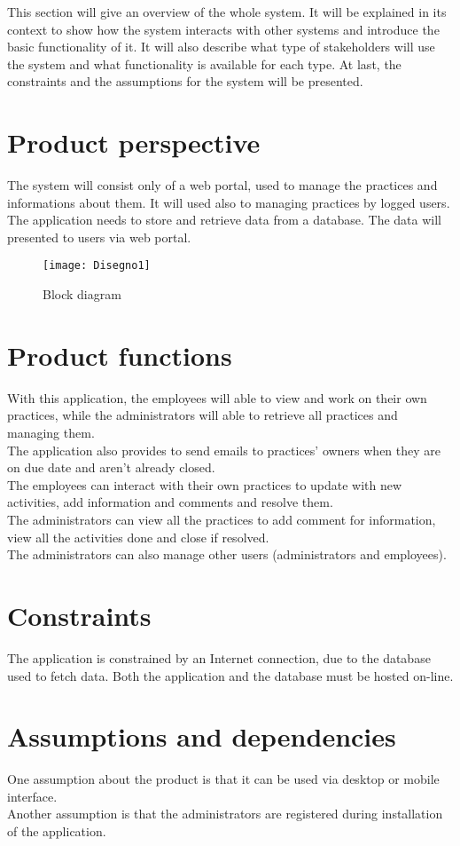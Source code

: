 \documentclass[../main.tex]{subfiles}
\begin{document}
	This section will give an overview of the whole system. It will be explained in its context to show how the system interacts with other systems and introduce the basic functionality of it. It will also describe what type of stakeholders will use the system and what functionality  is available for each type. At last, the constraints and the assumptions for the system will be presented.
	\section{Product perspective}
		The system will consist only of a web portal, used to manage the practices and informations about them. It will used also to managing practices by logged users.\\
		The application needs to store and retrieve data from a database. The data will presented to users via web portal.
		\begin{figure}[h]
			\centering
			\texttt{[image: Disegno1]}
			\caption{Block diagram}
		\end{figure}
	\section{Product functions}
		With this application, the employees will able to view and work on their own practices, while the administrators will able to retrieve all practices and managing them.\\
		The application also provides to send emails to practices' owners when they are on due date and aren't already closed.\\
		The employees can interact with their own practices to update with new activities, add information and comments and resolve them.\\
		The administrators can view all the practices to add comment for information, view all the activities done and close if resolved.\\
		The administrators can also manage other users (administrators and employees).
	\section{Constraints}
		The application is constrained by an Internet connection, due to the database used to fetch data. Both the application and the database must be hosted on-line. 
	\section{Assumptions and dependencies}
		One assumption about the product is that it can be used via desktop or mobile interface.\\
		Another assumption is that the administrators are registered during installation of the application.
\end{document}
